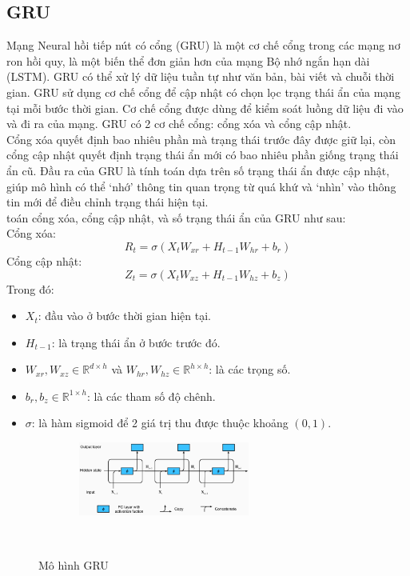 \documentclass[conference]{IEEEtran}
\begin{document}
\subsection{GRU}
Mạng Neural hồi tiếp nút có cổng (GRU) là một cơ chế cổng trong các mạng nơ ron hồi quy, là một biến thể đơn giản hơn của mạng Bộ nhớ ngắn hạn dài (LSTM). GRU có thể xử lý dữ liệu tuần tự như văn bản, bài viết và chuỗi thời gian.
GRU sử dụng cơ chế cổng để cập nhật có chọn lọc trạng thái ẩn của mạng tại mỗi bước thời gian. Cơ chế cổng được dùng để kiểm soát luồng dữ liệu đi vào và đi ra của mạng. GRU có 2 cơ chế cổng: cổng xóa và cổng cập nhật. \\
Cổng xóa quyết định bao nhiêu phần mà trạng thái trước đây được giữ lại, còn cổng cập nhật quyết định trạng thái ẩn mới có bao nhiêu phần giống trạng thái ẩn cũ. Đầu ra của GRU là tính toán dựa trên số trạng thái ẩn được cập nhật, giúp mô hình có thể ‘nhớ’ thông tin quan trọng từ quá khứ và ‘nhìn’ vào thông tin mới để điều chỉnh trạng thái hiện tại.\\ toán cổng xóa, cổng cập nhật, và số trạng thái ẩn của GRU như sau:\\
Cổng xóa:
\[
R_t = \sigma(X_t W_{xr} + H_{t-1} W_{hr} + b_r)
\]
Cổng cập nhật:
\[
Z_t = \sigma(X_t W_{xz} + H_{t-1} W_{hz} + b_z)
\]
Trong đó:\\
\begin{itemize}
    \item $X_t$: đầu vào ở bước thời gian hiện tại.
    \item $H_{t-1}$: là trạng thái ẩn ở bước trước đó.
    \item $W_{xr}, W_{xz} \in \mathbb{R}^{d \times h}$ và $W_{hr}, W_{hz} \in \mathbb{R}^{h \times h}$: là các trọng số.
    \item $b_r, b_z \in \mathbb{R}^{1 \times h}$: là các tham số độ chênh.
    \item $\sigma$: là hàm sigmoid để 2 giá trị thu được thuộc khoảng $(0,1)$.
\end{itemize} 

\vspace{-1em} %
\begin{figure}[H]
    \centering
    \includegraphics[width=0.5\textwidth]{bibliography/Figure/GRUModel.png}
    \caption{Mô hình GRU}
    \label{fig:GRU_Model}
\end{figure} 
\end{document}
